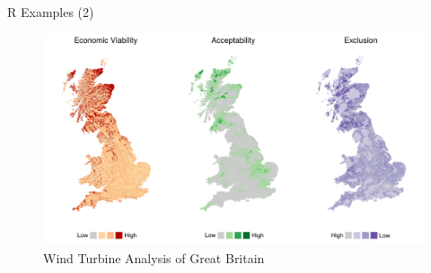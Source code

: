 \documentclass[10pt,ignorenonframetext,]{beamer}
\begin{document}
\begin{frame}{R Examples (2)}

\begin{figure}

{\centering \includegraphics[width=1\linewidth]{../images/WindTurbineStudies} 

}

\caption{Wind Turbine Analysis of Great Britain}\label{fig:unnamed-chunk-5}
\end{figure}

\end{frame}
\end{document}
